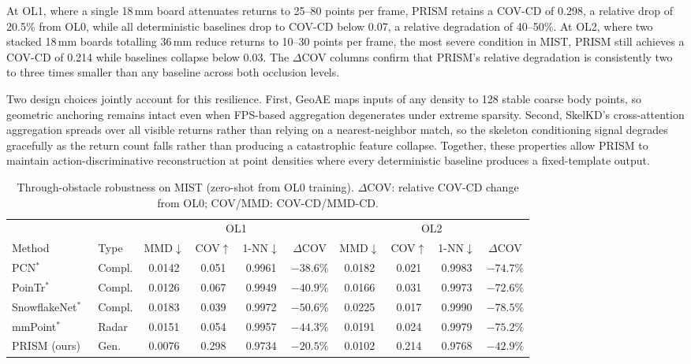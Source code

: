 \documentclass{article}
\begin{document}
At OL1, where a single 18\,mm board attenuates returns to 25--80 points per frame,
PRISM retains a COV-CD of 0.298, a relative drop of 20.5\% from OL0, while all
deterministic baselines drop to COV-CD below 0.07, a relative degradation of
40--50\%.
At OL2, where two stacked 18\,mm boards totalling 36\,mm reduce returns to 10--30 points
per frame, the most severe condition in MIST, PRISM still achieves
a COV-CD of 0.214 while baselines collapse below 0.03.
The $\Delta$COV columns confirm that PRISM's relative degradation is consistently
two to three times smaller than any baseline across both occlusion levels.

Two design choices jointly account for this resilience.
First, GeoAE maps inputs of any density to 128 stable coarse body points,
so geometric anchoring remains intact even when FPS-based aggregation degenerates
under extreme sparsity.
Second, SkelKD's cross-attention aggregation spreads over all visible returns
rather than relying on a nearest-neighbor match, so the skeleton conditioning signal
degrades gracefully as the return count falls rather than producing a catastrophic
feature collapse.
Together, these properties allow PRISM to maintain action-discriminative
reconstruction at point densities where every deterministic baseline produces a
fixed-template output.

\begin{table}[h]
  \centering
  \caption{Through-obstacle robustness on MIST (zero-shot from OL0 training). $\Delta$COV: relative COV-CD change from OL0; COV/MMD: COV-CD/MMD-CD.}
  \label{tab:mist_per_level}
  \small
  \setlength{\tabcolsep}{3.5pt}
  \begin{tabular}{ll cccc cccc}
    \toprule
    & & \multicolumn{4}{c}{OL1} & \multicolumn{4}{c}{OL2} \\
    \cmidrule(r){3-6}\cmidrule(l){7-10}
    Method & Type
      & MMD$\downarrow$ & COV$\uparrow$ & 1-NN$\downarrow$ & $\Delta$COV
      & MMD$\downarrow$ & COV$\uparrow$ & 1-NN$\downarrow$ & $\Delta$COV \\
    \midrule
    PCN$^*$~\cite{pcn}
      & Compl. & 0.0142 & 0.051 & 0.9961 & $-38.6\%$
               & 0.0182 & 0.021 & 0.9983 & $-74.7\%$ \\
    PoinTr$^*$~\cite{pointr}
      & Compl. & 0.0126 & 0.067 & 0.9949 & $-40.9\%$
               & 0.0166 & 0.031 & 0.9973 & $-72.6\%$ \\
    SnowflakeNet$^*$~\cite{snowflake}
      & Compl. & 0.0183 & 0.039 & 0.9972 & $-50.6\%$
               & 0.0225 & 0.017 & 0.9990 & $-78.5\%$ \\
    mmPoint$^*$~\cite{mmpoint}
      & Radar  & 0.0151 & 0.054 & 0.9957 & $-44.3\%$
               & 0.0191 & 0.024 & 0.9979 & $-75.2\%$ \\
    PRISM (ours)
      & Gen.   & 0.0076 & 0.298 & 0.9734 & $-20.5\%$
               & 0.0102 & 0.214 & 0.9768 & $-42.9\%$ \\
    \bottomrule
  \end{tabular}
\end{table}
\end{document}
